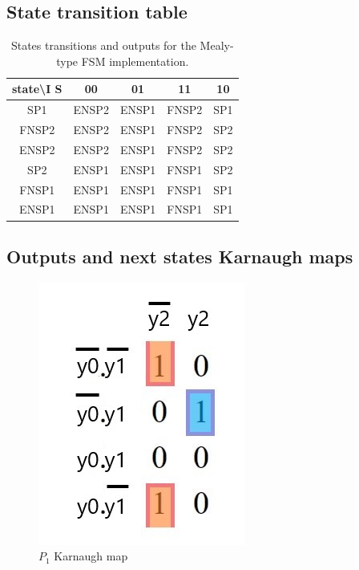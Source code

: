 \documentclass[../../e3_tp3_main.tex]{subfiles}
\begin{document}
\subsection{State transition table}
\begin{table}[H]	%
	\centering
		\begin{tabular}{|c|c|c|c|c|}
		\hline 
		state\textbackslash I S & 00 & 01 & 11 & 10 \\ 
		\hline 
		SP1 & ENSP2 & ENSP1 & FNSP2 & SP1 \\ 
		\hline 
		FNSP2 & ENSP2 & ENSP1 & FNSP2 & SP2 \\ 
		\hline 
		ENSP2 & ENSP2 & ENSP1 & FNSP2 & SP2 \\ 
		\hline 
		SP2 & ENSP1 & ENSP1 & FNSP1 & SP2 \\ 
		\hline 
		FNSP1 & ENSP1 & ENSP1 & FNSP1 & SP1 \\ 
		\hline 
		ENSP1 & ENSP1 & ENSP1 & FNSP1 & SP1 \\ 
		\hline 
		\end{tabular} 
	\caption[States transitions and outputs for the Mealy-type FSM implementation]{States transitions and outputs for the Mealy-type FSM implementation.}
	\label{tab:ej1_moore_transitions}
\end{table}

\subsection{Outputs and next states Karnaugh maps}
\begin{figure}[H]
	\centering
	\includegraphics[scale=0.8]{figures/e3_tp3_ej1_moore_b1_kmap.jpg}
	\caption{$P_1$ Karnaugh map}
\end{figure}
\end{document}
